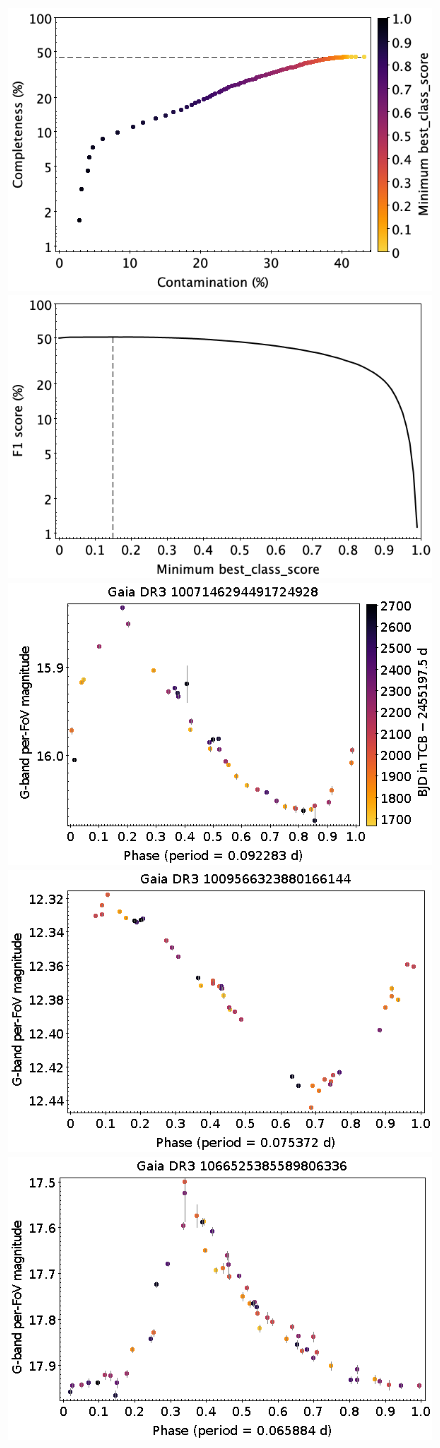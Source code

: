 \documentclass[longauth]{aa}
\begin{document}
\begin{appendix}
\begin{figure}
\centering
{} \includegraphics[width=0.45\hsize]{figures/appendix/DSCT_cls_scc.png}  
\hspace{2mm}
 \includegraphics[width=0.45\hsize]{figures/appendix/DSCT_cls_sf1.png} \\ 
\vspace{4mm}
 \includegraphics[width=0.45\hsize]{figures/appendix/DSCT-18.png}  
\hspace{2mm}
 \includegraphics[width=0.45\hsize]{figures/appendix/DSCT-21.png} \\
\vspace{4mm}
 \includegraphics[width=0.45\hsize]{figures/appendix/DSCT-49.png}  

\end{figure}
\end{appendix}
\end{document}
